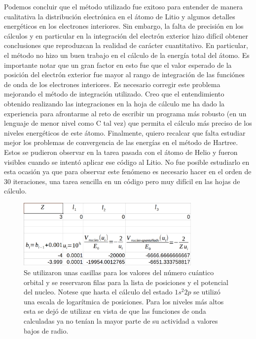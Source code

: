 \documentclass[a4paper]{article}
\begin{document}
Podemos concluir que el método utilizado fue exitoso para entender de manera cualitativa la distribución electrónica en el átomo de Litio y algunos detalles energéticos en los electrones interiores. Sin embargo, la falta de precisión en los cálculos y en particular en la integración del electrón exterior hizo difícil obtener conclusiones que reproduzcan la realidad de carácter cuantitativo. En particular, el método no hizo un buen trabajo en el cálculo de la energía total del átomo. Es importante notar que un gran factor en esto fue que el valor esperado de la posición del electrón exterior fue mayor al rango de integración de las funciónes de onda de los electrones interiores. Es necesario corregir este problema mejorando el método de integración utilizado. Creo que el entendimiento obtenido realizando las integraciones en la hoja de cálculo me ha dado la experiencia para afrontarme al reto de escribir un programa más robusto (en un lenguaje de menor nivel como C tal vez) que permita el cálculo más preciso de los niveles energéticos de este átomo. Finalmente, quiero recalcar que falta estudiar mejor los problemas de convergencia de las energías en el método de Hartree. Estos se pudieron observar en la tarea pasada con el átomo de Helio y fueron visibles cuando se intentó aplicar ese código al Litio. No fue posible estudiarlo en esta ocasión ya que para observar este fenómeno es necesario hacer en el orden de $30$ iteraciones, una tarea sencilla en un código pero muy difícil en las hojas de cálculo.

\begin{figure}
\begin{center}
\includegraphics[width = 0.8\textwidth]{final_atomica_1.png}
\caption{\label{fig:constantes}Se utilizaron unas casillas para los valores del número cuántico orbital y se reservaron filas para la lista de posiciones y el potencial del nucleo. Notese que hasta el cálculo del estado $1s^2 2p$ se utilizó una escala de logarítmica de posiciones. Para los niveles más altos esta se dejó de utilizar en vista de que las funciones de onda calculadas ya no tenían la mayor parte de su actividad a valores bajos de radio.}
\end{center}
\end{figure}
\end{document}
